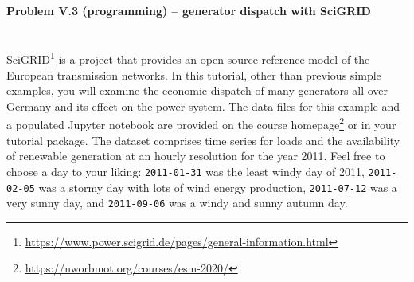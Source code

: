 \documentclass[11pt,a4paper,fleqn]{scrartcl}
\begin{document}
\newpage
\paragraph{Problem V.3 (programming) -- generator dispatch with SciGRID}~\\

SciGRID\footnote{\url{https://www.power.scigrid.de/pages/general-information.html}} is a project that provides an open source reference model of the European transmission networks. In this tutorial, other than previous simple examples, you will examine the economic dispatch of many generators all over Germany and its effect on the power system. The data files for this example and a populated Jupyter notebook are provided on the course homepage\footnote{\url{https://nworbmot.org/courses/esm-2020/}} or in your tutorial package. The dataset comprises time series for loads and the availability of renewable generation at an hourly resolution for the year 2011. Feel free to choose a day to your liking: \texttt{2011-01-31} was the least windy day of 2011, \texttt{2011-02-05} was a stormy day with lots of wind energy production, \texttt{2011-07-12} was a very sunny day, and \texttt{2011-09-06} was a windy and sunny autumn day.
\end{document}
